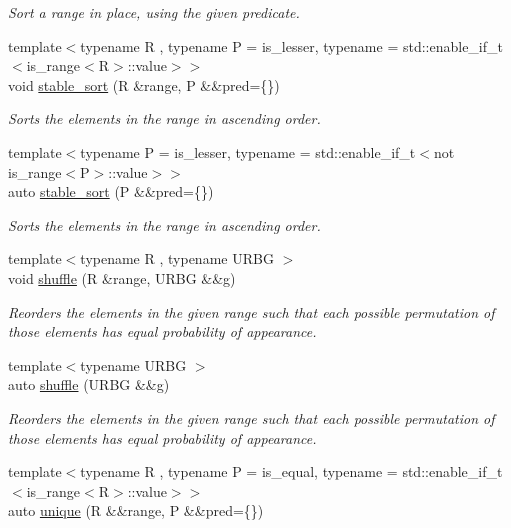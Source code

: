 \begin{DoxyCompactItemize}
\begin{DoxyCompactList}\small\item\em Sort a range in place, using the given predicate. \end{DoxyCompactList}\item 
{\footnotesize template$<$typename R , typename P  = is\+\_\+lesser, typename  = std\+::enable\+\_\+if\+\_\+t$<$is\+\_\+range$<$\+R$>$\+::value$>$$>$ }\\void \mbox{\hyperlink{namespacerah_a215c9f80364af9121e2be42d1ebacdbf}{stable\+\_\+sort}} (R \&range, P \&\&pred=\{\})
\begin{DoxyCompactList}\small\item\em Sorts the elements in the range in ascending order. \end{DoxyCompactList}\item 
{\footnotesize template$<$typename P  = is\+\_\+lesser, typename  = std\+::enable\+\_\+if\+\_\+t$<$not is\+\_\+range$<$\+P$>$\+::value$>$$>$ }\\auto \mbox{\hyperlink{namespacerah_aa45a27d7e9403b82624632e1ee3daf6f}{stable\+\_\+sort}} (P \&\&pred=\{\})
\begin{DoxyCompactList}\small\item\em Sorts the elements in the range in ascending order. \end{DoxyCompactList}\item 
{\footnotesize template$<$typename R , typename U\+R\+BG $>$ }\\void \mbox{\hyperlink{namespacerah_ab1d00692710a6ee8e5b3110a56bbd59c}{shuffle}} (R \&range, U\+R\+BG \&\&g)
\begin{DoxyCompactList}\small\item\em Reorders the elements in the given range such that each possible permutation of those elements has equal probability of appearance. \end{DoxyCompactList}\item 
{\footnotesize template$<$typename U\+R\+BG $>$ }\\auto \mbox{\hyperlink{namespacerah_a93f2ab22986c011ca40816c52638e0ad}{shuffle}} (U\+R\+BG \&\&g)
\begin{DoxyCompactList}\small\item\em Reorders the elements in the given range such that each possible permutation of those elements has equal probability of appearance. \end{DoxyCompactList}\item 
{\footnotesize template$<$typename R , typename P  = is\+\_\+equal, typename  = std\+::enable\+\_\+if\+\_\+t$<$is\+\_\+range$<$\+R$>$\+::value$>$$>$ }\\auto \mbox{\hyperlink{namespacerah_a7c4f0afb068c908600b357e111148df7}{unique}} (R \&\&range, P \&\&pred=\{\})

\end{DoxyCompactItemize}

